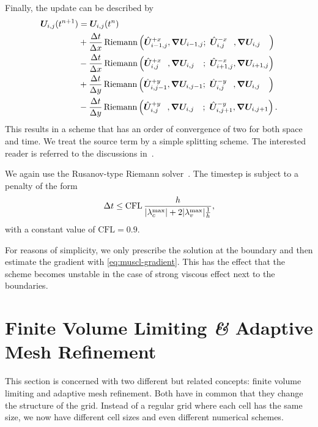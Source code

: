 Finally, the update can be described by
\begin{align}
  \begin{split}
    \cellAvg (t^{n+1}) &= \cellAvg (t^n)
    \\ &+
  \frac{\Delta t}{\Delta x}
    \Riemann \left(
      \evolvedCellAvg[i-1,j]{+x}, \gradCellAvg[i-1,j]; \ %
      \evolvedCellAvg[i,j\phantom{-1}]{-x}, \gradCellAvg[i,j\phantom{-1}]
    \right)
    \\ &-
  \frac{\Delta t}{\Delta x}
    \Riemann \left(
      \evolvedCellAvg[i,j\phantom{+1}]{+x}, \gradCellAvg[i,j\phantom{+1}]; \ %
      \evolvedCellAvg[i+1,j]{-x}, \gradCellAvg[i+1,j]
    \right)
    \\ &+
  \frac{\Delta t}{\Delta y}
    \Riemann \left(
      \evolvedCellAvg[i,j-1]{+y}, \gradCellAvg[i,j-1]; \ %
      \evolvedCellAvg[i,j\phantom{-1}]{-y}, \gradCellAvg[i,j\phantom{-1}]
    \right)
    \\ &-
  \frac{\Delta t}{\Delta y}
    \Riemann \left(
      \evolvedCellAvg[i,j\phantom{+1}]{+y}, \gradCellAvg[i,j\phantom{+1}]; \ %
      \evolvedCellAvg[i,j+1]{-y}, \gradCellAvg[i,j+1]
    \right).
  \end{split}
\end{align}
This results in a scheme that has an order of convergence of two for both space and time.
We treat the source term by a simple splitting scheme.
The interested reader is referred to the discussions in~\cite{leVeque2002finite,toro2009riemann}.

We again use the Rusanov-type Riemann solver~.
The timestep is subject to a penalty of the form
\begin{equation}\label{eq:cfl-muscl}
 \Delta t \leq  \text{CFL} \, \frac{h}{\maxConvEigen + 2 \maxViscEigen \frac{1}{h}},
\end{equation}
with a constant value of $\text{CFL} = 0.9$.

For reasons of simplicity, we only prescribe the solution at the boundary and then estimate the gradient with \cref{eq:muscl-gradient}.
This has the effect that the scheme becomes unstable in the case of strong viscous effect next to the boundaries.

\section{Finite Volume Limiting \textit{\&} Adaptive Mesh Refinement}\label{sec:grid}
This section is concerned with two different but related concepts:
finite volume limiting and adaptive mesh refinement.
Both have in common that they change the structure of the grid.
Instead of a regular grid where each cell has the same size, we now have different cell sizes and even different numerical schemes.

